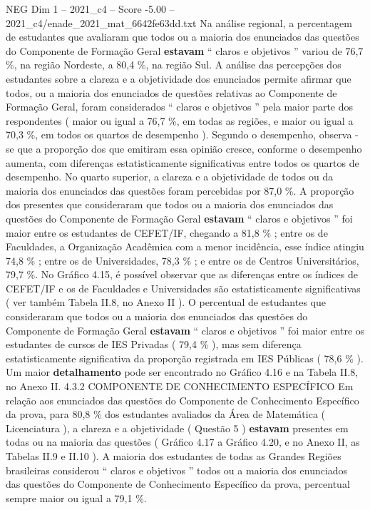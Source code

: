 \begin{textsample}{NEG Dim 1 – 2021\_c4 – Score -5.00 – 2021\_c4/enade\_2021\_mat\_6642fe63dd.txt}
Na análise regional, a percentagem de estudantes que avaliaram que todos ou a maioria dos enunciados das questões do Componente de Formação Geral \textbf{estavam} “ claros e objetivos ” variou de 76,7 \%, na região Nordeste, a 80,4 \%, na região Sul.
A análise das percepções dos estudantes sobre a clareza e a objetividade dos enunciados permite afirmar que todos, ou a maioria dos enunciados de questões relativas ao Componente de Formação Geral, foram considerados “ claros e objetivos ” pela maior parte dos respondentes ( maior ou igual a 76,7 \%, em todas as regiões, e maior ou igual a 70,3 \%, em todos os quartos de desempenho ).
Segundo o desempenho, observa -se que a proporção dos que emitiram essa opinião cresce, conforme o desempenho aumenta, com diferenças estatisticamente significativas entre todos os quartos de desempenho.
No quarto superior, a clareza e a objetividade de todos ou da maioria dos enunciados das questões foram percebidas por 87,0 \%.
A proporção dos presentes que consideraram que todos ou a maioria dos enunciados das questões do Componente de Formação Geral \textbf{estavam} “ claros e objetivos ” foi maior entre os estudantes de CEFET/IF, chegando a 81,8 \% ; entre os de Faculdades, a Organização Acadêmica com a menor incidência, esse índice atingiu 74,8 \% ; entre os de Universidades, 78,3 \% ; e entre os de Centros Universitários, 79,7 \%.
No Gráfico 4.15, é possível observar que as diferenças entre os índices de CEFET/IF e os de Faculdades e Universidades são estatisticamente significativas ( ver também Tabela II.8, no Anexo II ).
O percentual de estudantes que consideraram que todos ou a maioria dos enunciados das questões do Componente de Formação Geral \textbf{estavam} “ claros e objetivos ” foi maior entre os estudantes de cursos de IES Privadas ( 79,4 \% ), mas sem diferença estatisticamente significativa da proporção registrada em IES Públicas ( 78,6 \% ).
Um maior \textbf{detalhamento} pode ser encontrado no Gráfico 4.16 e na Tabela II.8, no Anexo II. 4.3.2 COMPONENTE DE CONHECIMENTO ESPECÍFICO Em relação aos enunciados das questões do Componente de Conhecimento Específico da prova, para 80,8 \% dos estudantes avaliados da Área de Matemática ( Licenciatura ), a clareza e a objetividade ( Questão 5 ) \textbf{estavam} presentes em todas ou na maioria das questões ( Gráfico 4.17 a Gráfico 4.20, e no Anexo II, as Tabelas II.9 e II.10 ).
A maioria dos estudantes de todas as Grandes Regiões brasileiras considerou “ claros e objetivos ” todos ou a maioria dos enunciados das questões do Componente de Conhecimento Específico da prova, percentual sempre maior ou igual a 79,1 \%.

\end{textsample}
